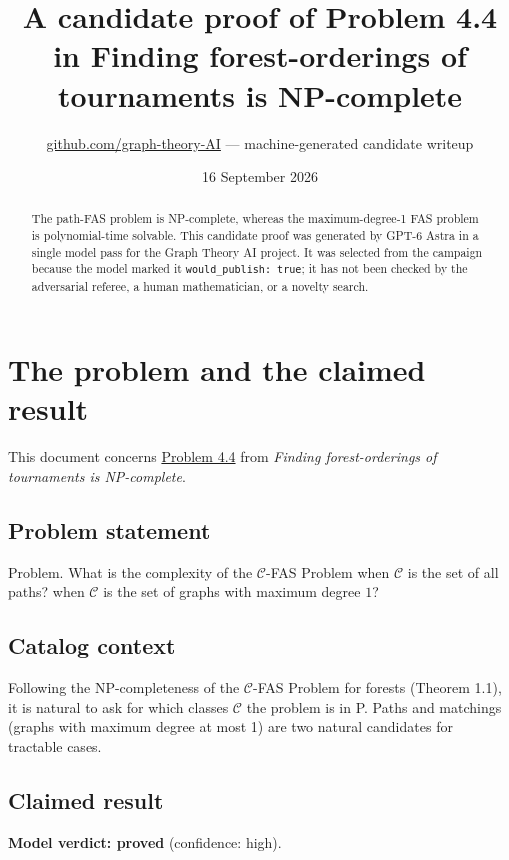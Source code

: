\documentclass[
  11pt,
  a4paper,
]{article}
\title{A candidate proof of Problem 4.4 in Finding forest-orderings of
tournaments is NP-complete}
\author{\href{https://github.com/graph-theory-AI}{github.com/graph-theory-AI}
--- machine-generated candidate writeup}
\date{16 September 2026}
\begin{document}
\maketitle
\begin{abstract}
The path-FAS problem is NP-complete, whereas the maximum-degree-1 FAS
problem is polynomial-time solvable. This candidate proof was generated
by GPT-6 Astra in a single model pass for the Graph Theory AI project.
It was selected from the campaign because the model marked it
\texttt{would\_publish:\ true}; it has not been checked by the
adversarial referee, a human mathematician, or a novelty search.
\end{abstract}

\section{The problem and the claimed
result}\label{the-problem-and-the-claimed-result}

This document concerns
\href{https://graph-theory-ai.github.io/graph-conjectures/arxiv/2402.10782__01/}{Problem
4.4} from \emph{Finding forest-orderings of tournaments is NP-complete}.

\subsection{Problem statement}\label{problem-statement}

Problem. What is the complexity of the \(\mathcal{C}\)-FAS Problem when
\(\mathcal{C}\) is the set of all paths? when \(\mathcal{C}\) is the set
of graphs with maximum degree \(1\)?

\subsection{Catalog context}\label{catalog-context}

Following the NP-completeness of the \(\mathcal{C}\)-FAS Problem for
forests (Theorem 1.1), it is natural to ask for which classes
\(\mathcal{C}\) the problem is in P. Paths and matchings (graphs with
maximum degree at most 1) are two natural candidates for tractable
cases.

\subsection{Claimed result}\label{claimed-result}

\textbf{Model verdict: proved} (confidence: high).
\end{document}
